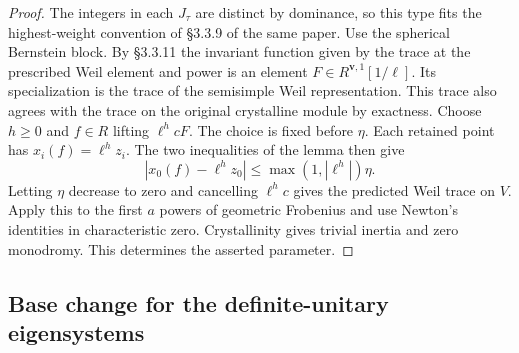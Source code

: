 \begin{proof}
The integers in each \(J_\tau\) are distinct by dominance, so this
type fits the highest-weight convention of \S3.3.9 of the same paper.
Use the spherical Bernstein block. By \S3.3.11 the invariant function
given by the trace at the prescribed Weil element and power is an element
\(F\in R^{\mathbf v,1}[1/\ell]\). Its specialization is the trace of
the semisimple Weil representation. This trace also agrees with the
trace on the original crystalline module by exactness. Choose \(h\ge0\)
and \(f\in R\) lifting \(\ell^h cF\). The choice is fixed
before \(\eta\). Each retained point has \(x_i(f)=\ell^h z_i\). The
two inequalities of the lemma then give
\[
       |x_0(f)-\ell^h z_0|\le\max(1,|\ell^h|)\eta .
\]
Letting \(\eta\) decrease to zero and cancelling \(\ell^h c\) gives
the predicted Weil trace on \(V\). Apply this to the first \(a\)
powers of geometric Frobenius and use Newton's identities in
characteristic zero. Crystallinity gives trivial inertia and zero
monodromy. This determines the asserted parameter.
\end{proof}

\subsection{Base change for the definite-unitary eigensystems}

